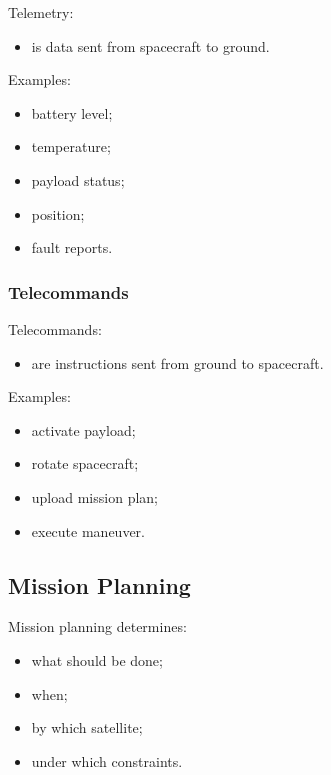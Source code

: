\documentclass[10pt,a4paper,twocolumn]{article}
\begin{document}
Telemetry:
\begin{itemize}
    \item is data sent from spacecraft to ground.
\end{itemize}

Examples:
\begin{itemize}
    \item battery level;
    \item temperature;
    \item payload status;
    \item position;
    \item fault reports.
\end{itemize}


\subsubsection*{Telecommands}

Telecommands:
\begin{itemize}
    \item are instructions sent from ground to spacecraft.
\end{itemize}

Examples:
\begin{itemize}
    \item activate payload;
    \item rotate spacecraft;
    \item upload mission plan;
    \item execute maneuver.
\end{itemize}


\subsection{Mission Planning}

Mission planning determines:
\begin{itemize}
    \item what should be done;
    \item when;
    \item by which satellite;
    \item under which constraints.
\end{itemize}
\end{document}
